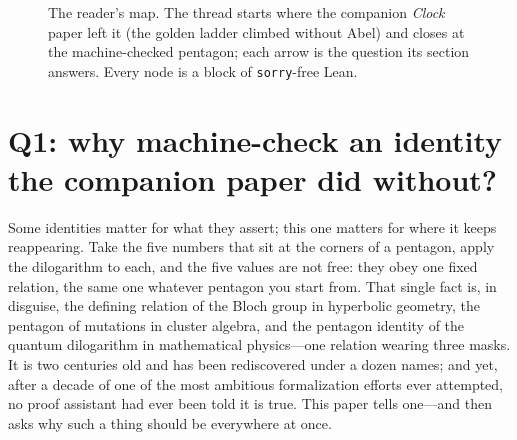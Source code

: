 \documentclass[11pt]{article}
\newcommand{\lean}[1]{\texttt{#1}}
\begin{document}
\begin{figure}[h]
\centering
{}
\caption{The reader's map. The thread starts where the companion \emph{Clock} paper left it
(the golden ladder climbed without Abel) and closes at the machine-checked pentagon; each
arrow is the question its section answers. Every node is a block of \lean{sorry}-free Lean.}
\label{fig:readermap}
\end{figure}

\section{Q1: why machine-check an identity the companion paper did without?}
\label{sec:intro}

Some identities matter for what they assert; this one matters for where it keeps
reappearing. Take the five numbers that sit at the corners of a pentagon, apply the
dilogarithm to each, and the five values are not free: they obey one fixed relation, the
same one whatever pentagon you start from. That single fact is, in disguise, the defining
relation of the Bloch group in hyperbolic geometry, the pentagon of mutations in cluster
algebra, and the pentagon identity of the quantum dilogarithm in mathematical
physics---one relation wearing three masks. It is two centuries old and has been
rediscovered under a dozen names; and yet, after a decade of one of the most ambitious
formalization efforts ever attempted, no proof assistant had ever been told it is true. This
paper tells one---and then asks why such a thing should be everywhere at once.
\end{document}
